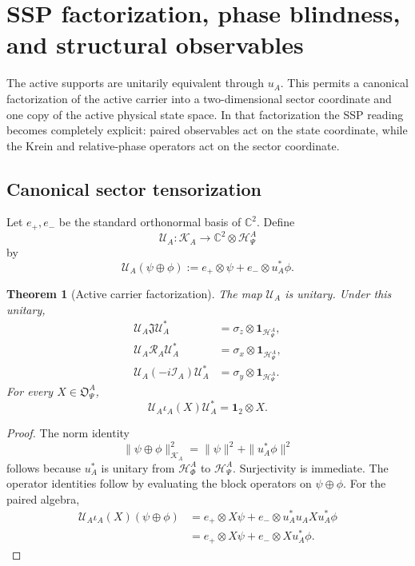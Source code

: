 \documentclass[11pt,reqno]{scrartcl}
\newcommand{\CC}{\mathbb C}
\newcommand{\fundJ}{\mathfrak J}
\newcommand{\idop}{\mathbf 1}
\newcommand{\polA}{u_A}
\newcommand{\RA}{\mathcal R_{A}}
\newcommand{\IA}{\mathcal I_{A}}
\newcommand{\actHP}{\mathscr H_{\Psi}^{A}}
\newcommand{\actHF}{\mathscr H_{\Phi}^{A}}
\newcommand{\actK}{\mathscr K_{A}}
\newcommand{\iotaA}{\iota_{A}}
\newcommand{\obsP}{\mathfrak O_{\Psi}^{A}}
\newcommand{\UA}{\mathcal U_{A}}
\newcommand{\sigmax}{\sigma_x}
\newcommand{\sigmay}{\sigma_y}
\newcommand{\sigmaz}{\sigma_z}
\newcommand{\eplus}{e_{+}}
\newcommand{\eminus}{e_{-}}
\theoremstyle{plain}
\newtheorem{theorem}{Theorem}[section]
\theoremstyle{definition}
\theoremstyle{remark}
\begin{document}
\section{SSP factorization, phase blindness, and structural observables}
\label{sec:ssp-factorization-phase}

The active supports are unitarily equivalent through \(\polA\).  This permits
a canonical factorization of the active carrier into a two-dimensional sector
coordinate and one copy of the active physical state space.  In that
factorization the SSP reading becomes completely explicit: paired observables
act on the state coordinate, while the Krein and relative-phase operators act
on the sector coordinate.

\subsection{Canonical sector tensorization}

Let \(\eplus,\eminus\) be the standard orthonormal basis of \(\CC^2\).
Define
\begin{equation}
  \boxed{
  \UA:\actK\longrightarrow\CC^2\otimes\actHP}
  \label{eq:UA-factorization-map}
\end{equation}
by
\begin{equation}
  \UA(\psi\oplus\phi)
  :=\eplus\otimes\psi
    +\eminus\otimes\polA^*\phi.
  \label{eq:UA-factorization-formula}
\end{equation}

\begin{theorem}[Active carrier factorization]
\label{thm:active-carrier-factorization}
The map \(\UA\) is unitary.  Under this unitary,
\begin{align}
  \UA\fundJ\UA^*
  &=\sigmaz\otimes\idop_{\actHP},
  \label{eq:J-factorized}\\
  \UA\RA\UA^*
  &=\sigmax\otimes\idop_{\actHP},
  \label{eq:R-factorized}\\
  \UA(-i\IA)\UA^*
  &=\sigmay\otimes\idop_{\actHP}.
  \label{eq:Q-factorized}
\end{align}
For every \(X\in\obsP\),
\begin{equation}
  \boxed{
  \UA\iotaA(X)\UA^*
  =\idop_{2}\otimes X.}
  \label{eq:paired-algebra-factorized}
\end{equation}
\end{theorem}

\begin{proof}
The norm identity
\begin{equation}
  \|\psi\oplus\phi\|_{\actK}^2
  =\|\psi\|^2+\|\polA^*\phi\|^2
\end{equation}
follows because \(\polA^*\) is unitary from \(\actHF\) to \(\actHP\).
Surjectivity is immediate.  The operator identities follow by evaluating the
block operators on \(\psi\oplus\phi\).  For the paired algebra,
\begin{align}
  \UA\iotaA(X)(\psi\oplus\phi)
  &=\eplus\otimes X\psi
    +\eminus\otimes\polA^*\polA X\polA^*\phi\\
  &=\eplus\otimes X\psi
    +\eminus\otimes X\polA^*\phi.
\end{align}
\end{proof}
\end{document}
